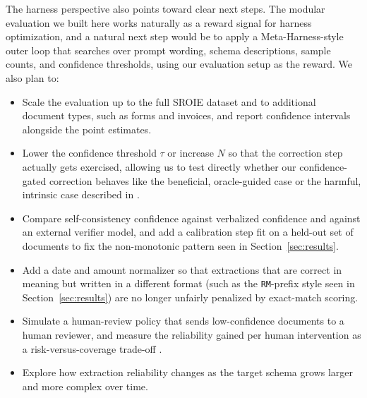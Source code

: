 \documentclass[conference]{IEEEtran}
\begin{document}
The harness perspective also points toward clear next steps. The modular evaluation we built here works naturally as a reward signal for harness optimization, and a natural next step would be to apply a Meta-Harness-style outer loop \cite{b2} that searches over prompt wording, schema descriptions, sample counts, and confidence thresholds, using our evaluation setup as the reward. We also plan to:
\begin{itemize}
    \item Scale the evaluation up to the full SROIE dataset and to additional document types, such as forms and invoices, and report confidence intervals alongside the point estimates.
    \item Lower the confidence threshold \(\tau\) or increase \(N\) so that the correction step actually gets exercised, allowing us to test directly whether our confidence-gated correction behaves like the beneficial, oracle-guided case or the harmful, intrinsic case described in \cite{b3}.
    \item Compare self-consistency confidence against verbalized confidence and against an external verifier model, and add a calibration step fit on a held-out set of documents to fix the non-monotonic pattern seen in Section~\ref{sec:results}.
    \item Add a date and amount normalizer so that extractions that are correct in meaning but written in a different format (such as the \texttt{RM}-prefix style seen in Section~\ref{sec:results}) are no longer unfairly penalized by exact-match scoring.
    \item Simulate a human-review policy that sends low-confidence documents to a human reviewer, and measure the reliability gained per human intervention as a risk-versus-coverage trade-off \cite{b16}.
    \item Explore how extraction reliability changes as the target schema grows larger and more complex over time.
\end{itemize}
\end{document}
